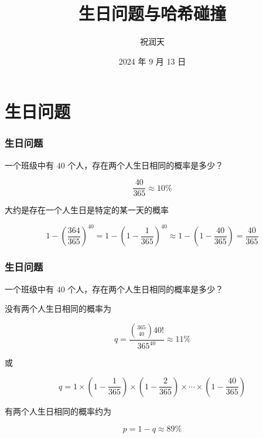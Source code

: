 \documentclass{beamer}
\title{生日问题与哈希碰撞}
\author{祝润天}
\institute{复旦大学计算机科学技术学院}
\date{2024 年 9 月 13 日}
\begin{document}
\begin{frame}
    
    \maketitle

\end{frame}

\section{生日问题}

\begin{frame}
    \frametitle{生日问题}

    \begin{problem}
        一个班级中有 $40$ 个人，存在两个人生日相同的概率是多少？
    \end{problem}

    \pause

    \[\frac{40}{365}\approx 10\%\]

    \begin{center}
        大约是存在一个人生日是特定的某一天的概率
    \end{center}

    \[1 - (\frac{364}{365})^{40} = 1 - (1 - \frac{1}{365})^{40} \approx 1 - (1 - \frac{40}{365}) = \frac{40}{365}\]

\end{frame}

\begin{frame}
    \frametitle{生日问题}

    \begin{problem}
        一个班级中有 $40$ 个人，存在两个人生日相同的概率是多少？
    \end{problem}
    
    没有两个人生日相同的概率为

    \[q = \frac{{365 \choose 40} 40!}{365^{40}}\approx 11\%\]

    或

    \[q = 1 \times (1 - \frac{1}{365}) \times (1 - \frac{2}{365}) \times \cdots \times (1 - \frac{40}{365})\]

    有两个人生日相同的概率约为

    \[p = 1 - q \approx 89\%\]

\end{frame}
\end{document}
